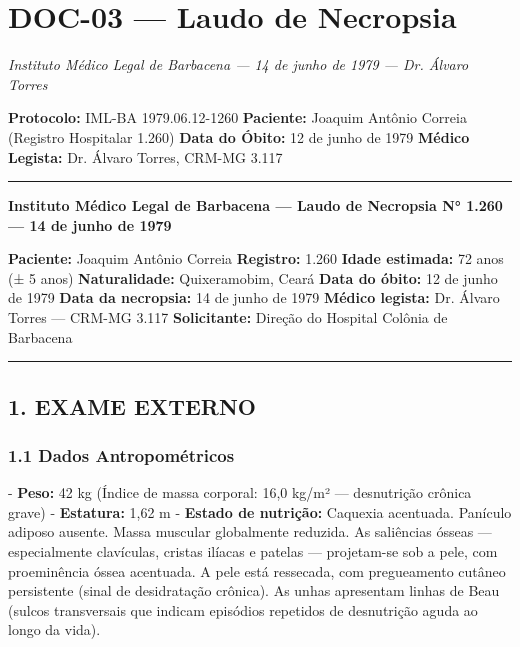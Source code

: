 \section*{\textbf{DOC-03} --- Laudo de Necropsia}

\noindent \textit{Instituto Médico Legal de Barbacena --- 14 de junho de 1979 --- Dr. Álvaro Torres}

\noindent \textbf{Protocolo:} IML-BA 1979.06.12-1260
\textbf{Paciente:} Joaquim Antônio Correia (Registro Hospitalar 1.260)
\textbf{Data do Óbito:} 12 de junho de 1979
\textbf{Médico Legista:} Dr. Álvaro Torres, CRM-MG 3.117

\vspace{0.5em}\noindent\rule{\textwidth}{0.5pt}\vspace{0.5em}

\noindent \textbf{Instituto Médico Legal de Barbacena --- Laudo de Necropsia N° 1.260 --- 14 de junho de 1979}

\noindent \textbf{Paciente:} Joaquim Antônio Correia
\textbf{Registro:} 1.260
\textbf{Idade estimada:} 72 anos (± 5 anos)
\textbf{Naturalidade:} Quixeramobim, Ceará
\textbf{Data do óbito:} 12 de junho de 1979
\textbf{Data da necropsia:} 14 de junho de 1979
\textbf{Médico legista:} Dr. Álvaro Torres --- CRM-MG 3.117
\textbf{Solicitante:} Direção do Hospital Colônia de Barbacena

\vspace{0.5em}\noindent\rule{\textwidth}{0.5pt}\vspace{0.5em}

\subsection*{1. EXAME EXTERNO}

\subsubsection*{1.1 Dados Antropométricos}

\noindent - \textbf{Peso:} 42 kg (Índice de massa corporal: 16,0 kg/m² --- desnutrição crônica grave)
- \textbf{Estatura:} 1,62 m
- \textbf{Estado de nutrição:} Caquexia acentuada. Panículo adiposo ausente. Massa muscular globalmente reduzida. As saliências ósseas --- especialmente clavículas, cristas ilíacas e patelas --- projetam-se sob a pele, com proeminência óssea acentuada. A pele está ressecada, com pregueamento cutâneo persistente (sinal de desidratação crônica). As unhas apresentam linhas de Beau (sulcos transversais que indicam episódios repetidos de desnutrição aguda ao longo da vida).

